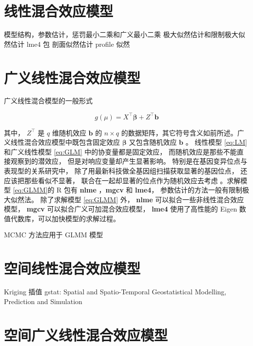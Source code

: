 \documentclass[12pt,a4paper,UTF8,twoside]{book}
\theoremstyle{definition}
\theoremstyle{definition}
\theoremstyle{definition}
\theoremstyle{remark}
\begin{document}
\hypertarget{Linear-Mixed-Effects-Models}{%
\section{线性混合效应模型}\label{Linear-Mixed-Effects-Models}}

模型结构，参数估计，惩罚最小二乘和广义最小二乘
极大似然估计和限制极大似然估计 lme4 包 \citep{Bates2015} 剖面似然估计
profile 似然

\hypertarget{Generalized-Linear-Mixed-Effects-Models}{%
\section{广义线性混合效应模型}\label{Generalized-Linear-Mixed-Effects-Models}}

广义线性混合模型的一般形式

\begin{equation}
g(\mu) = X^{\top}\boldsymbol{\beta} + Z^{\top}\mathbf{b}  \label{eq:GLMM}
\end{equation}

\noindent 其中， \(Z^{\top}\) 是 \(q\) 维随机效应 \(\mathbf{b}\) 的
\(n \times q\)
的数据矩阵，其它符号含义如前所述。广义线性混合效应模型中既包含固定效应
\(\boldsymbol{\beta}\) 又包含随机效应 \(\mathbf{b}\) 。 线性模型
\eqref{eq:LM} 和广义线性模型 \eqref{eq:GLM} 中的协变量都是固定效应，
而随机效应是那些不能直接观察到的潜效应， 但是对响应变量却产生显著影响。
特别是在基因变异位点与表现型的关系研究中，
除了用最新科技做全基因组扫描获取显著的基因位点，
还应该把那些看似不显著， 联合在一起却显著的位点作为随机效应去考虑
\citep{Yang2010Common}。求解模型 \eqref{eq:GLMM}的 R 包有 \textbf{nlme}
，\textbf{mgcv} 和 \textbf{lme4}， 参数估计的方法一般有限制极大似然法。
除了求解模型 \eqref{eq:GLMM} 外， \textbf{nlme}
可以拟合一些非线性混合效应模型， \textbf{mgcv}
可以拟合广义可加混合效应模型， \textbf{lme4} 使用了高性能的 Eigen
数值代数库，可以加快模型的求解过程。

MCMC 方法应用于 GLMM 模型 \citep{MCMCglmm2010}

\section{空间线性混合效应模型}

Kriging 插值 \citep{gstat2004, gstat2016} gstat: Spatial and
Spatio-Temporal Geostatistical Modelling, Prediction and Simulation

\hypertarget{Spatial-Generalized-linear-mixed-effects-models}{%
\section{空间广义线性混合效应模型}\label{Spatial-Generalized-linear-mixed-effects-models}}
\end{document}
